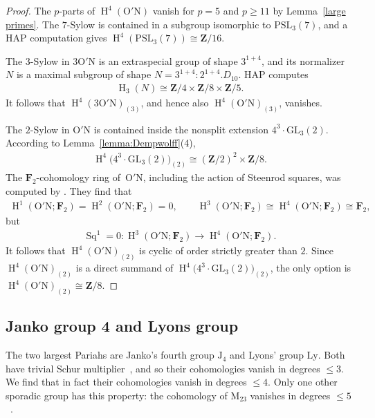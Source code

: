 \documentclass[pdftex]{sigma}
\numberwithin{equation}{section}
\newcommand\bF{\mathbf F}
\newcommand\bZ{\mathbf Z}
\newcommand\rJ{\mathrm J}
\newcommand\rM{\mathrm M}
\DeclareMathOperator\homology{H}
\renewcommand\H{\homology}
\newcommand\<\langle
\renewcommand\>\rangle
\DeclareMathOperator\Sq{Sq}
\begin{document}
\begin{proof} The $p$-parts of $\H^4(\mathrm{O'N})$ vanish for $p=5$ and $p\geq 11$ by Lemma~\ref{large primes}. The $7$-Sylow is contained in a subgroup isomorphic to $\mathrm{PSL}_3(7)$, and a HAP computation gives $\H^4(\mathrm{PSL}_3(7)) \cong \bZ/16$.

 The 3-Sylow in $3\mathrm{O'N}$ is an extraspecial group of shape $3^{1+4}$, and its normalizer $N$ is a maximal subgroup of shape $N = 3^{1+4}:2^{1+4}.D_{10}$. HAP computes
 \begin{gather*} \H_3(N) \cong \bZ/4 \times \bZ/8 \times \bZ/5.\end{gather*}
 It follows that $\H^4(3\mathrm{O'N})_{(3)}$, and hence also $\H^4(\mathrm{O'N})_{(3)}$, vanishes.

 The $2$-Sylow in $\mathrm{O'N}$ is contained inside the nonsplit extension $4^3\cdot \mathrm{GL}_3(2)$. According to Lemma~\ref{lemma:Dempwolff}(4), \begin{gather*}\H^4\big(4^3\cdot \mathrm{GL}_3(2)\big)_{(2)} \cong (\bZ/2)^2 \times \bZ/8.\end{gather*} The $\bF_2$-cohomology ring of~$\mathrm{O'N}$, including the action of Steenrod squares, was computed by \cite{MR1345306}. They find that
 \begin{gather*}\H^1(\mathrm{O'N};\bF_2) = \H^2(\mathrm{O'N};\bF_2) = 0, \qquad
 \H^3(\mathrm{O'N};\bF_2) \cong \H^4(\mathrm{O'N};\bF_2) \cong \bF_2,\end{gather*}
 but \begin{gather*}\Sq^1 = 0\colon \H^3(\mathrm{O'N};\bF_2) \to \H^4(\mathrm{O'N};\bF_2).\end{gather*} It follows that $\H^4(\mathrm{O'N})_{(2)}$ is cyclic of order strictly greater than $2$. Since $\H^4(\mathrm{O'N})_{(2)}$ is a direct summand of $\H^4\big(4^3\cdot \mathrm{GL}_3(2)\big)_{(2)}$, the only option is $\H^4(\mathrm{O'N})_{(2)} \cong \bZ/8$.
\end{proof}

\subsection{Janko group 4 and Lyons group}

The two largest Pariahs are Janko's fourth group $\rJ_4$ and Lyons' group $\mathrm{Ly}$. Both have trivial Schur multiplier~\cite{MR2611672}, and so their cohomologies vanish in degrees $\leq 3$. We find that in fact their cohomologies vanish in degrees $\leq 4$. Only one other sporadic group has this property: the cohomology of $\rM_{23}$ vanishes in degrees $\leq 5$~\cite{MR1736514}.
\end{document}
